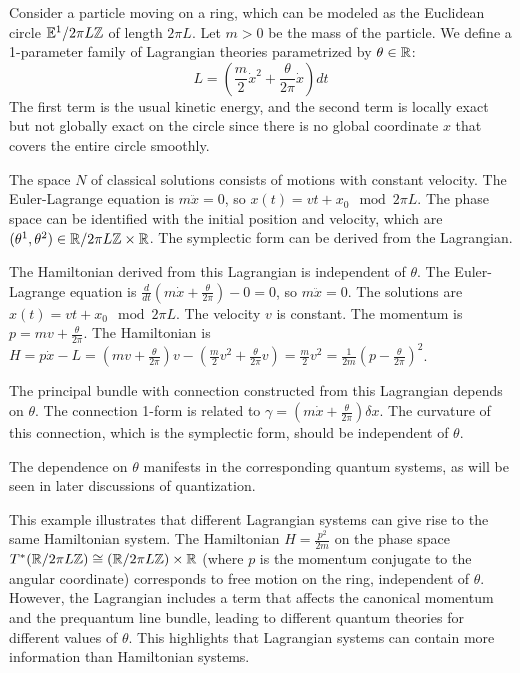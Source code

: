 \begin{example}
Consider a particle moving on a ring, which can be modeled as the Euclidean circle $\mathbb{E}^1 / 2\pi L \mathbb{Z}$ of length $2\pi L$. Let $m > 0$ be the mass of the particle. We define a 1-parameter family of Lagrangian theories parametrized by $\theta \in \mathbb{R}$:
\[ L = \left( \frac{m}{2} \dot{x}^2 + \frac{\theta}{2\pi} \dot{x} \right) dt \]
The first term is the usual kinetic energy, and the second term is locally exact but not globally exact on the circle since there is no global coordinate $x$ that covers the entire circle smoothly.

The space $N$ of classical solutions consists of motions with constant velocity. The Euler-Lagrange equation is $m \ddot{x} = 0$, so $x(t) = vt + x_0 \mod 2\pi L$. The phase space can be identified with the initial position and velocity, which are $(\theta^1, \theta^2) \in \mathbb{R} / 2\pi L \mathbb{Z} \times \mathbb{R}$. The symplectic form can be derived from the Lagrangian.

The Hamiltonian derived from this Lagrangian is independent of $\theta$. 
The Euler-Lagrange equation is $\frac{d}{dt} (m \dot{x} + \frac{\theta}{2\pi}) - 0 = 0$, so $m \ddot{x} = 0$. The solutions are $x(t) = vt + x_0 \mod 2\pi L$. The velocity $v$ is constant. The momentum is $p = m v + \frac{\theta}{2\pi}$. The Hamiltonian is $H = p \dot{x} - L = (m v + \frac{\theta}{2\pi}) v - (\frac{m}{2} v^2 + \frac{\theta}{2\pi} v) = \frac{m}{2} v^2 = \frac{1}{2m} (p - \frac{\theta}{2\pi})^2$.

The principal bundle with connection constructed from this Lagrangian depends on $\theta$. The connection 1-form is related to $\gamma = (m \dot{x} + \frac{\theta}{2\pi}) \delta x$. The curvature of this connection, which is the symplectic form, should be independent of $\theta$.

The dependence on $\theta$ manifests in the corresponding quantum systems, as will be seen in later discussions of quantization.
\end{example}

\begin{remark}
This example illustrates that different Lagrangian systems can give rise to the same Hamiltonian system. The Hamiltonian $H = \frac{p^2}{2m}$ on the phase space $T^* (\mathbb{R} / 2\pi L \mathbb{Z}) \cong (\mathbb{R} / 2\pi L \mathbb{Z}) \times \mathbb{R}$ (where $p$ is the momentum conjugate to the angular coordinate) corresponds to free motion on the ring, independent of $\theta$. However, the Lagrangian includes a term that affects the canonical momentum and the prequantum line bundle, leading to different quantum theories for different values of $\theta$. This highlights that Lagrangian systems can contain more information than Hamiltonian systems.
\end{remark}


